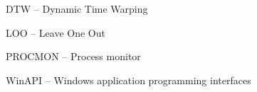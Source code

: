 
DTW -- Dynamic Time Warping

LOO -- Leave One Out

PROCMON -- Process monitor

WinAPI -- Windows application programming interfaces

